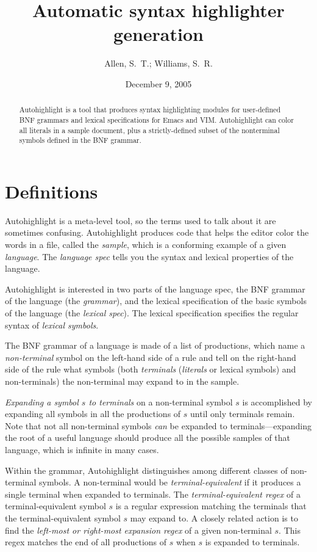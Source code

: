 \documentclass[]{article}
\title{Automatic syntax highlighter generation}
\author{Allen, S.~T.; Williams, S.~R.}
\date{December 9, 2005}
\begin{document}
\maketitle
\begin{abstract}
  Autohighlight is a tool that produces syntax highlighting modules
  for user-defined BNF grammars and lexical specifications for Emacs
  and VIM. Autohighlight can color all literals in a sample document,
  plus a strictly-defined subset of the nonterminal symbols defined in
  the BNF grammar.
\end{abstract}
  \section{Definitions}
  Autohighlight is a meta-level tool, so the terms used to talk about
  it are sometimes confusing. Autohighlight produces code that helps
  the editor color the words in a file, called the {\em sample}, which
  is a conforming example of a given {\em language}. The {\em language
    spec} tells you the syntax and lexical properties of the language.
  
  Autohighlight is interested in two parts of the language spec, the
  BNF grammar of the language (the {\em grammar}), and the lexical
  specification of the basic symbols of the language (the {\em lexical
    spec}). The lexical specification specifies the regular syntax of
  {\em lexical symbols}.
  
  The BNF grammar of a language is made of a list of productions,
  which name a {\em non-terminal} symbol on the left-hand side of a
  rule and tell on the right-hand side of the rule what symbols (both {\em
    terminals} ({\em literals} or lexical symbols) and non-terminals) the non-terminal
  may expand to in the sample.
  
  {\em Expanding a symbol $s$ to terminals} on a non-terminal symbol
  $s$ is accomplished by expanding all symbols in all the productions
  of $s$ until only terminals remain. Note that not all non-terminal
  symbols {\em can} be expanded to terminals---expanding the root of a
  useful language should produce all the possible samples of that
  language, which is infinite in many cases.
  
  Within the grammar, Autohighlight distinguishes among different
  classes of non-terminal symbols. A non-terminal would be {\em
    terminal-equivalent} if it produces a single terminal when
  expanded to terminals. The {\em terminal-equivalent regex} of a
  terminal-equivalent symbol $s$ is a regular expression matching the
  terminals that the terminal-equivalent symbol $s$ may expand to. A
  closely related action is to find the {\em left-most or right-most
    expansion regex} of a given non-terminal $s$. This regex matches
  the end of all productions of $s$ when $s$ is expanded to terminals.
  
\end{document}
